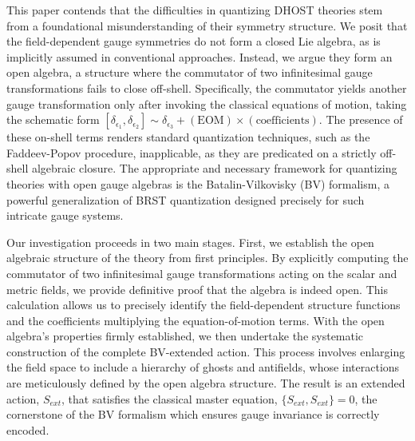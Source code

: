 \documentclass[twocolumn]{aastex631}
\begin{document}
This paper contends that the difficulties in quantizing DHOST theories stem from a foundational misunderstanding of their symmetry structure. We posit that the field-dependent gauge symmetries do not form a closed Lie algebra, as is implicitly assumed in conventional approaches. Instead, we argue they form an open algebra, a structure where the commutator of two infinitesimal gauge transformations fails to close off-shell. Specifically, the commutator yields another gauge transformation only after invoking the classical equations of motion, taking the schematic form $[\delta_{\epsilon_1}, \delta_{\epsilon_2}] \sim \delta_{\epsilon_3} + (\text{EOM}) \times (\text{coefficients})$. The presence of these on-shell terms renders standard quantization techniques, such as the Faddeev-Popov procedure, inapplicable, as they are predicated on a strictly off-shell algebraic closure. The appropriate and necessary framework for quantizing theories with open gauge algebras is the Batalin-Vilkovisky (BV) formalism, a powerful generalization of BRST quantization designed precisely for such intricate gauge systems.

Our investigation proceeds in two main stages. First, we establish the open algebraic structure of the theory from first principles. By explicitly computing the commutator of two infinitesimal gauge transformations acting on the scalar and metric fields, we provide definitive proof that the algebra is indeed open. This calculation allows us to precisely identify the field-dependent structure functions and the coefficients multiplying the equation-of-motion terms. With the open algebra's properties firmly established, we then undertake the systematic construction of the complete BV-extended action. This process involves enlarging the field space to include a hierarchy of ghosts and antifields, whose interactions are meticulously defined by the open algebra structure. The result is an extended action, $S_{ext}$, that satisfies the classical master equation, $\{S_{ext}, S_{ext}\} = 0$, the cornerstone of the BV formalism which ensures gauge invariance is correctly encoded.
\end{document}
